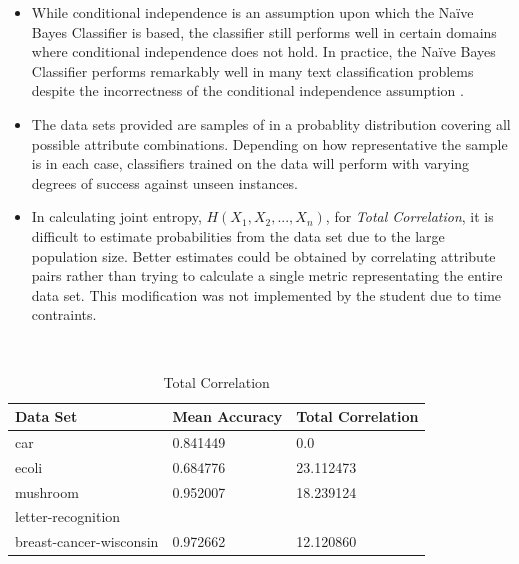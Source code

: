 \documentclass[10pt]{report}
\begin{document}
\begin{itemize}
  \item While conditional independence is an assumption upon which the
    Na\"{i}ve Bayes Classifier is based, the classifier still performs
    well in certain domains where conditional independence does not
    hold. In practice, the Na\"{i}ve Bayes Classifier performs
    remarkably well in many text classification problems despite the
    incorrectness of the conditional independence assumption
    \cite{Mitchell1997}. 

  \item The data sets provided are samples of in a probablity
    distribution covering all possible attribute
    combinations. Depending on how representative the sample is in
    each case, classifiers trained on the data will perform with
    varying degrees of success against unseen instances.

  \item In calculating joint entropy, \(H(X_1,X_2,...,X_n)\), for
    \textit{Total Correlation}, it is difficult to estimate
    probabilities from the data set due to the large population
    size. Better estimates could be obtained by correlating attribute
    pairs rather than trying to calculate a single metric
    representating the entire data set. This modification was not
    implemented by the student due to time contraints. 
\end{itemize}

\\
\begin{table}[h]
  \centering
  \begin{tabular}{ |l|l|l|} 
    \hline
    \textbf{Data Set} & \textbf{Mean Accuracy} & \textbf{Total Correlation} \\ \hline
    car                      &  0.841449  &  0.0       \\ \hline
    ecoli                    &  0.684776  &  23.112473 \\ \hline
    mushroom                 &  0.952007  &  18.239124 \\ \hline
    letter-recognition       &            &  \\ \hline
    breast-cancer-wisconsin  &  0.972662  &  12.120860 \\ \hline
  \end{tabular}
  \caption{Total Correlation}
  \label{tab:correlation}
\end{table}
\end{document}
